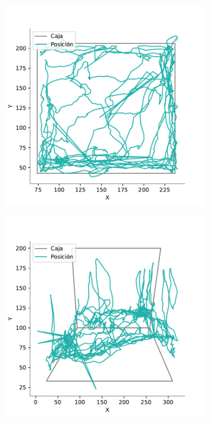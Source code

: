 \begin{figure}[]
  \centering
  \begin{subfigure}{0.45\textwidth}
    \centering
    \includegraphics[width=\textwidth]{figures/raw-trayectory-top-4128-2020-12-02.pdf}
    \caption{}
  \end{subfigure}
  \begin{subfigure}{0.45\textwidth}
    \centering
    \includegraphics[width=\textwidth]{figures/raw-trayectory-lateral-4128-2020-12-02.pdf}

\end{subfigure}
\end{figure}
